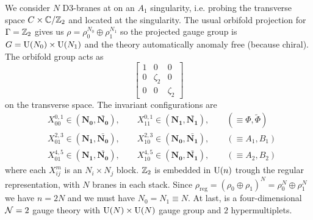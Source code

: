         We consider $N$ D$3$-branes at on an $A_1$ singularity, i.e. probing the transverse space $C\times\mathbb{C}/\mathbb{Z}_2$ and located at the singularity. The usual orbifold projection for $\Gamma=\mathbb{Z}_2$ gives us $\rho=\rho^{N_0}_0\oplus\rho^{N_1}_1$ so the projected gauge group is $G=\text{U}(N_0)\times\text{U}(N_1)$ and the theory automatically anomaly free (because chiral). The orbifold group acts as
        \begin{equation}
            \begin{bmatrix}
                1 & 0 & 0 \\
                0 & \zeta_2 & 0 \\
                0 & 0 & \zeta_2
            \end{bmatrix}
        \end{equation}
        on the transverse space. The invariant configurations are
        \begin{align}
            &X^{0,1}_{00}\in(\boldsymbol{N_0},\bar{\boldsymbol{N_0}}),\qquad X^{0,1}_{11}\in(\boldsymbol{N_1},\bar{\boldsymbol{N_1}}),\qquad (\equiv\Phi,\tilde{\Phi})\\
            &X^{2,3}_{01}\in(\boldsymbol{N_1},\bar{\boldsymbol{N_0}}),\qquad X^{2,3}_{10}\in(\boldsymbol{N_0},\bar{\boldsymbol{N_1}}),\qquad (\equiv A_1,B_1)\\
            &X^{4,5}_{01}\in(\boldsymbol{N_1},\bar{\boldsymbol{N_0}}),\qquad X^{4,5}_{10}\in(\boldsymbol{N_0},\bar{\boldsymbol{N_1}}),\qquad (\equiv A_2,B_2)
        \end{align}
        where each $X^m_{ij}$ is an $N_i\times N_j$ block. $\mathbb{Z}_2$ is embedded in $\text{U}(n)$ trough the regular representation, with $N$ branes in each stack. Since $\rho_{\text{reg}}=(\rho_0\oplus\rho_1)^N=\rho^N_0\oplus\rho^N_1$ we have $n=2N$ and we must have $N_0=N_1\equiv N$. At last, is a four-dimensional $\mathcal{N}=2$ gauge theory with $\text{U}(N)\times\text{U}(N)$ gauge group and $2$ hypermultiplets.


